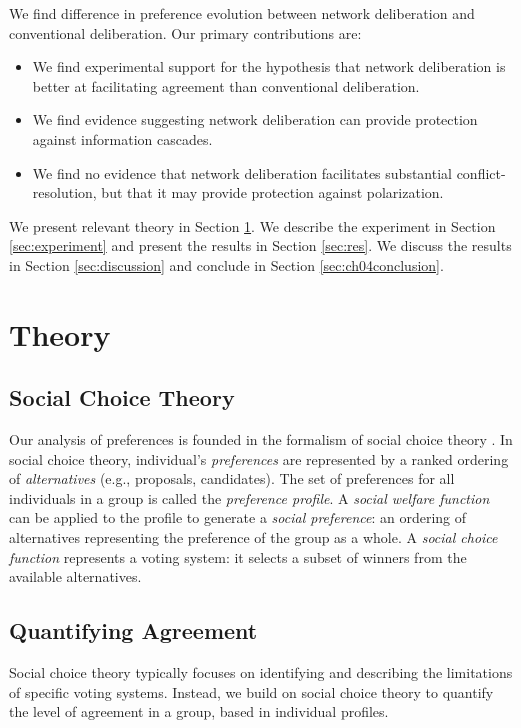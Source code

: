 We find difference in preference evolution between network deliberation and conventional deliberation. Our primary contributions are:
\begin{itemize}
    \item We find experimental support for the hypothesis that network deliberation is better at facilitating agreement than conventional deliberation.
    \item We find evidence suggesting network deliberation can provide protection against information cascades.
    \item We find no evidence that network deliberation facilitates substantial conflict-resolution, but that it may provide protection against polarization.
\end{itemize}

We present relevant theory in Section \ref{sec:theory}.
We describe the experiment in Section \ref{sec:experiment} and present the results in Section \ref{sec:res}.
We discuss the results in Section \ref{sec:discussion} and conclude in Section \ref{sec:ch04conclusion}.

\section{Theory}
\label{sec:theory}
\subsection{Social Choice Theory}
Our analysis of preferences is founded in the formalism of social choice theory \cite{arrow_social_2012, gaertner_primer_2009}.
In social choice theory, individual's {\em preferences} are represented by a ranked ordering of {\em alternatives} (e.g., proposals, candidates).
The set of preferences for all individuals in a group is called the {\em preference profile}.
A {\em social welfare function} can be applied to the profile to generate a {\em social preference}: an ordering of alternatives representing the preference of the group as a whole.
A {\em social choice function} represents a voting system: it selects a subset of winners from the available alternatives.

\subsection{Quantifying Agreement}

Social choice theory typically focuses on identifying and describing the limitations of specific voting systems.
Instead, we build on social choice theory to quantify the level of agreement in a group, based in individual profiles.

